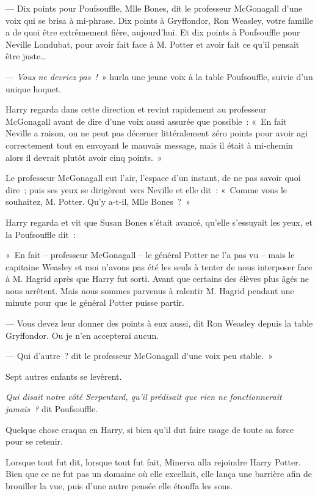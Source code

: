 --- Dix points pour Poufsouffle, Mlle Bones, dit le professeur McGonagall d'une voix qui se brisa à mi-phrase.
Dix points à Gryffondor, Ron Weasley, votre famille a de quoi être extrêmement fière, aujourd'hui.
Et dix points à Poufsouffle pour Neville Londubat, pour avoir fait face à M. Potter et avoir fait ce qu'il pensait être juste…

--- \emph{Vous ne devriez pas~!}~» hurla une jeune voix à la table Poufsouffle, suivie d'un unique hoquet.

Harry regarda dans cette direction et revint rapidement au professeur McGonagall avant de dire d'une voix aussi assurée que possible~: «~En fait Neville a raison, on ne peut pas décerner littéralement zéro points pour avoir agi correctement tout en envoyant le mauvais message, mais il était à mi-chemin alors il devrait plutôt avoir cinq points.~»

Le professeur McGonagall eut l'air, l'espace d'un instant, de ne pas savoir quoi dire~; puis ses yeux se dirigèrent vers Neville et elle dit~: «~Comme vous le souhaitez, M. Potter.
Qu'y a-t-il, Mlle Bones~?~»

Harry regarda et vit que Susan Bones s'était avancé, qu'elle s'essuyait les yeux, et la Poufsouffle dit~:

«~En fait -- professeur McGonagall -- le général Potter ne l'a pas vu -- mais le capitaine Weasley et moi n'avons pas été les seuls à tenter de nous interposer face à M. Hagrid après que Harry fut sorti.
Avant que certains des élèves plus âgés ne nous arrêtent.
Mais nous sommes parvenus à ralentir M. Hagrid pendant une minute pour que le général Potter puisse partir.

--- Vous devez leur donner des points à eux aussi, dit Ron Weasley depuis la table Gryffondor.
Ou je n'en accepterai aucun.

--- Qui d'autre~? dit le professeur McGonagall d'une voix peu stable.~»

Sept autres enfants se levèrent.

\emph{Qui disait notre côté Serpentard, qu'il prédisait que rien ne fonctionnerait jamais~?} dit Poufsouffle.

Quelque chose craqua en Harry, si bien qu'il dut faire usage de toute sa force pour se retenir.

\later

Lorsque tout fut dit, lorsque tout fut fait, Minerva alla rejoindre Harry Potter.
Bien que ce ne fut pas un domaine où elle excellait, elle lança une barrière afin de brouiller la vue, puis d'une autre pensée elle étouffa les sons.

